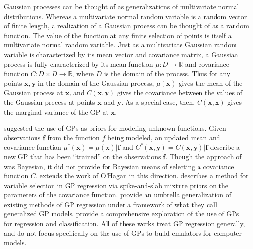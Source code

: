 \documentclass{article}
\begin{document}
Gaussian processes can be thought of as generalizations of multivariate normal distributions. Whereas a multivariate normal random variable is a random vector of finite length, a realization of a Gaussian process can be thought of as a random function. The value of the function at any finite selection of points is itself a multivariate normal random variable. Just as a multivariate Gaussian random variable is characterized by its mean vector and covariance matrix, a Gaussian process is fully characterized by its mean function $\mu:D\to \mathbb R$ and covariance function $C:D\times D\to \mathbb R$, where $D$ is the domain of the process. Thus for any points $\mathbf x,\mathbf y$ in the domain of the Gaussian process, $\mu(\mathbf x)$ gives the mean of the Gaussian process at $\mathbf x$, and $C(\mathbf x, \mathbf y)$ gives the covariance between the values of the Gaussian process at points $\mathbf x$ and $\mathbf y$. As a special case, then, $C(\mathbf x,\mathbf x)$ gives the marginal variance of the GP at $\mathbf x$. 


\cite{OHagan1978} suggested the use of GPs as priors for modeling unknown functions. Given observations $\mathbf f$ from the function $f$ being modeled, an updated mean and covariance function $\mu^*(\mathbf x)=\mu(\mathbf x)|\mathbf f$ and $C^*(\mathbf x,\mathbf y) = C(\mathbf x,\mathbf y)|\mathbf f$ describe a new GP that has been ``trained'' on the observations $\mathbf f$. 
Though the approach of \cite{OHagan1978} was Bayesian, it did not provide for Bayesian means of selecting a covariance function $C$. \cite{Neal} extends the work of O'Hagan in this direction. \cite{Savitsky2011} describes a method for variable selection in GP regression via spike-and-slab mixture priors on the parameters of the covariance function. \cite{Shang2013} provide an umbrella generalization of existing methods of GP regression under a framework of what they call generalized GP models. \cite{Rasmussen2006} provide a comprehensive exploration of the use of GPs for regression and classification. All of these works treat GP regression generally, and do not focus specifically on the use of GPs to build emulators for computer models.
\end{document}

